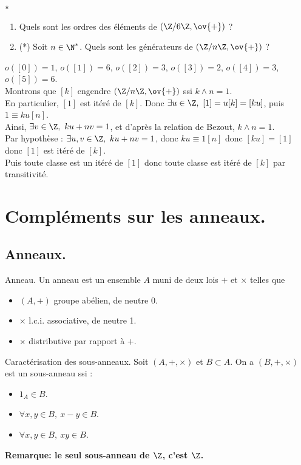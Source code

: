 \documentclass[11pt]{article}
\begin{document}
\vspace*{-0.8cm}

\begin{ex}{$\star$}{}
    \begin{enumerate}
        \item Quels sont les ordres des éléments de $(\Z/6\Z,\ov{+})$ ?
        \item (*) Soit $n\in\N^*$. Quels sont les générateurs de $(\Z/n\Z,\ov{+})$ ?
    \end{enumerate} 
    \tcblower
     $o([0])=1$, $o([1])=6$, $o([2])=3$, $o([3])=2$, $o([4])=3$, $o([5])=6$.\\
     Montrons que $[k]$ engendre $(\Z/n\Z,\ov{+})$ ssi $k\land n=1$.\\
    \boxed{\ra} En particulier, $[1]$ est itéré de $[k]$. Donc $\exists u\in\Z, ~ [1]=u[k]=[ku]$, puis $1\equiv ku[n]$.\\
    Ainsi, $\exists v \in \Z, ~ ku+nv=1$, et d'après la relation de Bezout, $k\land n=1$.\\
    \boxed{\la} Par hypothèse : $\exists u,v \in \Z, ~ ku+nv=1$, donc $ku\equiv 1[n]$ donc $[ku]=[1]$ donc $[1]$ est itéré de $[k]$.\\
    Puis toute classe est un itéré de $[1]$ donc toute classe est itéré de $[k]$ par transitivité.
\end{ex}

\section{Compléments sur les anneaux.}

\subsection{Anneaux.}

\begin{rappel}{Anneau.}{}
    Un anneau est un ensemble $A$ muni de deux lois $+$ et $\times$ telles que
    \begin{itemize}
        \item $(A,+)$ groupe abélien, de neutre $0$.
        \item $\times$ l.c.i. associative, de neutre 1.
        \item $\times$ distributive par rapport à $+$.
    \end{itemize}
\end{rappel}

\begin{rappel}{Caractérisation des sous-anneaux.}{}
    Soit $(A,+,\times)$ et $B\subset A$. On a $(B,+,\times)$ est un sous-anneau ssi :
    \begin{itemize}
        \item $1_A\in B$.
        \item $\forall x,y \in B, ~ x-y\in B$.
        \item $\forall x,y \in B, ~ xy\in B$.
    \end{itemize}
    \bf{Remarque:} le seul sous-anneau de $\Z$, c'est $\Z$.
\end{rappel}
\end{document}

